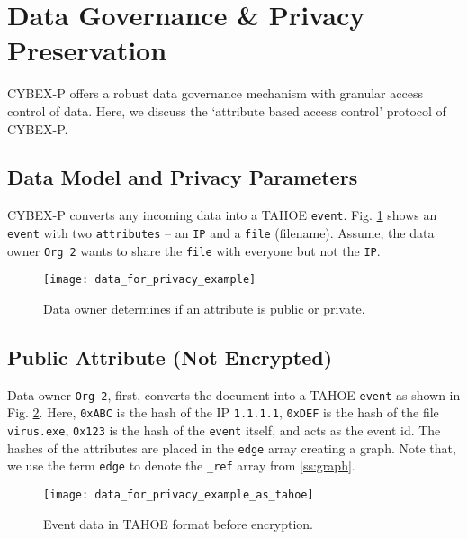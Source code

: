 \section{Data Governance \& Privacy Preservation}\label{sec:datagov}

CYBEX-P offers a robust data governance mechanism with granular access control of data. Here, we discuss the `attribute based access control' protocol of CYBEX-P.

\subsection{Data Model and Privacy Parameters}

CYBEX-P converts any incoming data into a TAHOE \texttt{event}.  Fig. \ref{fig:priv1} shows an \texttt{event} with two \texttt{attributes} -- an \texttt{IP} and a \texttt{file} (filename). Assume, the data owner \texttt{Org 2} wants to share the \texttt{file} with everyone but not the \texttt{IP}.

\begin{figure}[ht]
	\texttt{[image: data\_for\_privacy\_example]} %
	\centering
	\caption{Data owner determines if an attribute is public or private.}
	\label{fig:priv1}
\end{figure}


\subsection{Public Attribute (Not Encrypted)}

Data owner \texttt{Org 2}, first, converts the document into a TAHOE \texttt{event} as shown in Fig. \ref{fig:priv2}. Here, \texttt{0xABC} is the hash of the IP \texttt{1.1.1.1}, \texttt{0xDEF} is the hash of the file \texttt{virus.exe}, \texttt{0x123} is the hash of the \texttt{event} itself, and acts as the event id. The hashes of the attributes are placed in the \texttt{edge} array creating a graph. Note that, we use the term \texttt{edge} to denote the \texttt{\_ref} array from \ref{ss:graph}.

\begin{figure}[ht]
	\texttt{[image: data\_for\_privacy\_example\_as\_tahoe]} %
	\centering
	\caption{Event data in TAHOE format before encryption.}
	\label{fig:priv2}
\end{figure}

